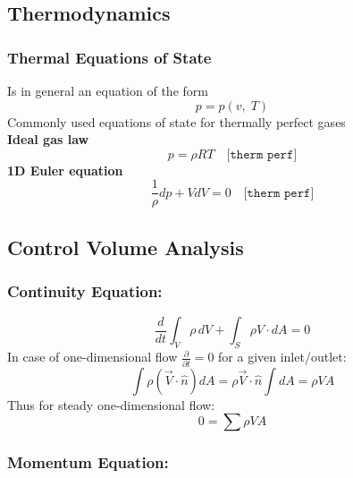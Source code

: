 \subsection*{Thermodynamics}

\subsubsection*{Thermal Equations of State}
	Is in general an equation of the form
	\begin{equation}
		p=p(v,\;T)
	\end{equation}
	Commonly used equations of state for thermally perfect gases\\
	\textbf{Ideal gas law}
	\begin{equation}
		p = \rho RT \quad \texttt{[therm perf]}
	\end{equation}\label{eq:ideal_gas}
	\textbf{1D Euler equation}
	\begin{equation}
		\frac{1}{\rho} dp + V dV = 0 \quad \texttt{[therm perf]}
	\end{equation}

\subsection*{Control Volume Analysis}

\subsubsection*{Continuity Equation:}

	\begin{equation}
		\frac{d}{dt} \int_V \rho \, dV + \int_S \rho V \cdot dA = 0
	\end{equation}
	In case of one-dimensional flow $\frac{\partial}{\partial t} = 0$ for a given inlet/outlet:
	\begin{equation}
		\int \rho (\vec{V} \cdot \hat{n} )d A = \rho\vec{V}\cdot \hat{n} \int d A = \rho V A
	\end{equation}\label{eq:1-d-massflow}
	\noindent
	Thus for steady one-dimensional flow:
	\begin{equation}
		0 = \sum \rho V A
	\end{equation}

\subsubsection*{Momentum Equation:}

